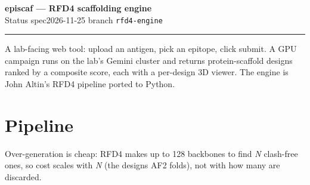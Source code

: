 \documentclass[11pt]{article}
\begin{document}
{\LARGE\bfseries episcaf --- RFD4 scaffolding engine}\\[2pt]
{\color{ink}\large Status spec}\hfill{\color{ink}2026-11-25 \;\textbf{\textbullet}\; branch \texttt{rfd4-engine}}\\[-4pt]
\rule{\linewidth}{0.8pt}

\vspace{2pt}
A lab-facing web tool: upload an antigen, pick an epitope, click submit. A GPU campaign runs on the
lab's Gemini cluster and returns protein-scaffold designs ranked by a composite score, each with a
per-design 3D viewer. The engine is John Altin's RFD4 pipeline ported to Python.

\vspace{-2pt}
\section*{Pipeline}
\vspace{2pt}
\begin{center}
\end{center}
\vspace{-3pt}
{\footnotesize Over-generation is cheap: RFD4 makes up to 128 backbones to find \emph{N} clash-free
ones, so cost scales with \emph{N} (the designs AF2 folds), not with how many are discarded.}
\end{document}
